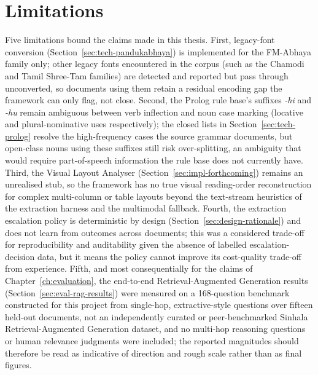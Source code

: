 \documentclass[12pt,a4paper,oneside]{report}
\begin{document}
\section{Limitations}
\label{sec:concl-limitations}
Five limitations bound the claims made in this thesis. First, legacy-font conversion (Section~\ref{sec:tech-pandukabhaya}) is implemented for the FM-Abhaya family only; other legacy fonts encountered in the corpus (such as the Chamodi and Tamil Shree-Tam families) are detected and reported but pass through unconverted, so documents using them retain a residual encoding gap the framework can only flag, not close. Second, the Prolog rule base's suffixes \textit{-hi} and \textit{-hu} remain ambiguous between verb inflection and noun case marking (locative and plural-nominative uses respectively); the closed lists in Section~\ref{sec:tech-prolog} resolve the high-frequency cases the source grammar documents, but open-class nouns using these suffixes still risk over-splitting, an ambiguity that would require part-of-speech information the rule base does not currently have. Third, the Visual Layout Analyser (Section~\ref{sec:impl-forthcoming}) remains an unrealised stub, so the framework has no true visual reading-order reconstruction for complex multi-column or table layouts beyond the text-stream heuristics of the extraction harness and the multimodal fallback. Fourth, the extraction escalation policy is deterministic by design (Section~\ref{sec:design-rationale}) and does not learn from outcomes across documents; this was a considered trade-off for reproducibility and auditability given the absence of labelled escalation-decision data, but it means the policy cannot improve its cost-quality trade-off from experience. Fifth, and most consequentially for the claims of Chapter~\ref{ch:evaluation}, the end-to-end Retrieval-Augmented Generation results (Section~\ref{sec:eval-rag-results}) were measured on a 168-question benchmark constructed for this project from single-hop, extractive-style questions over fifteen held-out documents, not an independently curated or peer-benchmarked Sinhala Retrieval-Augmented Generation dataset, and no multi-hop reasoning questions or human relevance judgments were included; the reported magnitudes should therefore be read as indicative of direction and rough scale rather than as final figures.
\end{document}
